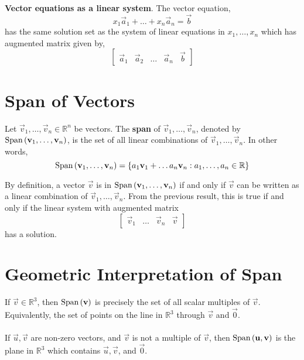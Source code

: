 \documentclass[letterpaper,12pt]{article}
\begin{document}
\begin{theorem}
\textbf{Vector equations as a linear system}. The vector equation,
\begin{equation*}
    x_1 \vec{a}_1 + \dots + x_n \vec{a}_n = \vec{b}
\end{equation*}
has the same solution set as the system of linear equations in $x_1, \dots, x_n$ which has augmented matrix given by,
\begin{equation*}
    \begin{bmatrix} \vec{a}_1 & \vec{a}_2 & \dots & \vec{a}_n & \vec{b} \end{bmatrix}
\end{equation*}
\end{theorem}

\section*{Span of Vectors}

\begin{definition}
Let $\vec{v}_1, \dots, \vec{v}_n \in \mathbb{R}^n$ be vectors. The \textbf{span} of $\vec{v}_1, \dots, \vec{v}_n$, denoted by $\text{Span}\left(\mathbf{v}_1, \dots, \mathbf{v}_n \right)$, is the set of all linear combinations of $\vec{v}_1, \dots, \vec{v}_n$. In other words,
\begin{equation*}
    \text{Span}\left(\mathbf{v}_1, \dots, \mathbf{v}_n \right) = \left\{ a_1 \mathbf{v}_1 + \dots a_n \mathbf{v}_n : a_1, \dots, a_n \in \mathbb{R} \right\}
\end{equation*}
\end{definition}

By definition, a vector $\vec{v}$ is in $\text{Span}\left(\mathbf{v}_1, \dots, \mathbf{v}_n \right)$ if and only if $\vec{v}$ can be written as a linear combination of $\vec{v}_1, \dots, \vec{v}_n$. From the previous result, this is true if and only if the linear system with augmented matrix
\begin{equation*}
    \begin{bmatrix} \vec{v}_1 & \dots & \vec{v}_n & \vec{v} \end{bmatrix}
\end{equation*}
has a solution.

\section*{Geometric Interpretation of Span}

If $\vec{v} \in \mathbb{R}^3$, then $\text{Span}\left(\mathbf{v} \right)$ is precisely the set of all scalar multiples of $\vec{v}$. Equivalently, the set of points on the line in $\mathbb{R}^3$ through $\vec{v}$ and $\vec{0}$.
\\ \\ If $\vec{u}, \vec{v}$ are non-zero vectors, and $\vec{v}$ is not a multiple of $\vec{v}$, then $\text{Span}\left(\mathbf{u}, \mathbf{v} \right)$ is the plane in $\mathbb{R}^3$ which contains $\vec{u}, \vec{v}$, and $\vec{0}$.
\end{document}
